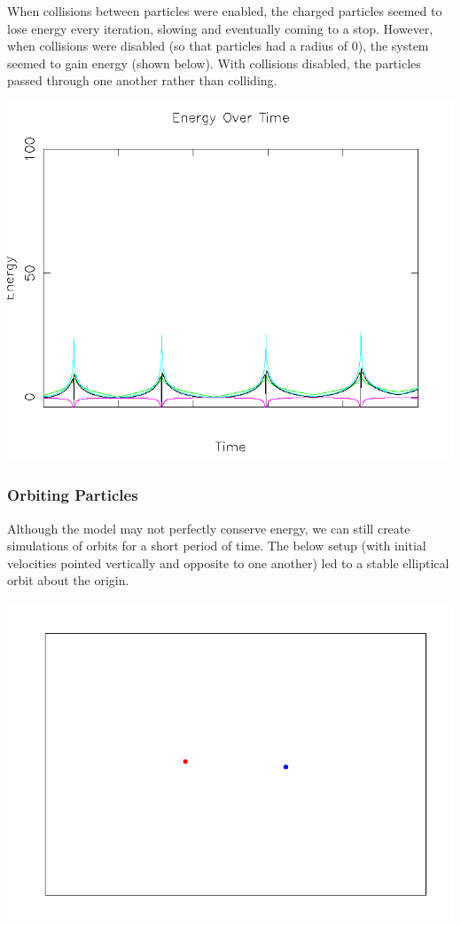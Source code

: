 \documentclass{article}
\begin{document}
When collisions between particles were enabled,
the charged particles seemed to lose energy every iteration, slowing and eventually coming to a stop.
However, when collisions were disabled (so that particles had a radius of 0),
the system seemed to gain energy (shown below). With collisions disabled,
the particles passed through one another rather than colliding.
\\
\begin{center}
    \includegraphics[scale=0.5]{charged_2_opp_energy_no_collision}
\end{center}

\subsubsection{Orbiting Particles}
Although the model may not perfectly conserve energy, we can still create simulations of orbits for a short period of time.
The below setup (with initial velocities pointed vertically and opposite to one another) led to a stable elliptical orbit about the origin.
\\
\begin{center}
    \includegraphics[scale=0.5]{orbit}
\end{center}
\end{document}
